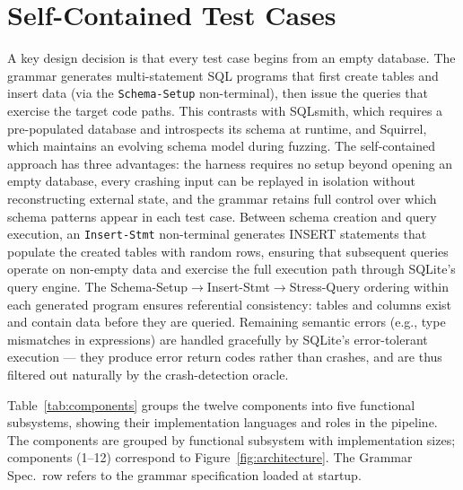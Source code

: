 \section{Self-Contained Test Cases}
A key design decision is that every test case begins from an empty database. The grammar generates multi-statement SQL programs that first create tables and insert data (via the \texttt{Schema-Setup} non-terminal), then issue the queries that exercise the target code paths. This contrasts with SQLsmith, which requires a pre-populated database and introspects its schema at runtime, and Squirrel, which maintains an evolving schema model during fuzzing. The self-contained approach has three advantages: the harness requires no setup beyond opening an empty database, every crashing input can be replayed in isolation without reconstructing external state, and the grammar retains full control over which schema patterns appear in each test case. Between schema creation and query execution, an \texttt{Insert-Stmt} non-terminal generates INSERT statements that populate the created tables with random rows, ensuring that subsequent queries operate on non-empty data and exercise the full execution path through SQLite's query engine. The Schema-Setup$\to$Insert-Stmt$\to$Stress-Query ordering within each generated program ensures referential consistency: tables and columns exist and contain data before they are queried. Remaining semantic errors (e.g., type mismatches in expressions) are handled gracefully by SQLite's error-tolerant execution --- they produce error return codes rather than crashes, and are thus filtered out naturally by the crash-detection oracle.

Table~\ref{tab:components} groups the twelve components into five functional subsystems, showing their implementation languages and roles in the pipeline. The components are grouped by functional subsystem with implementation sizes; components (1--12) correspond to Figure~\ref{fig:architecture}. The Grammar Spec.\ row refers to the grammar specification loaded at startup.

